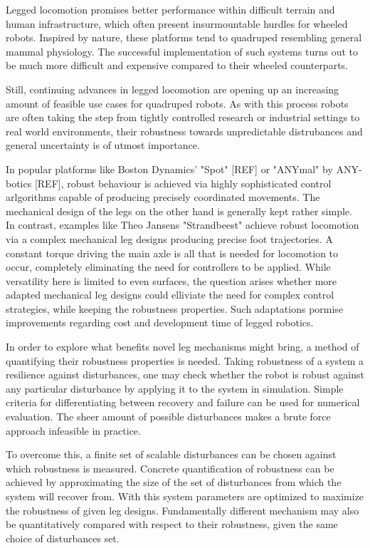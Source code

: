 Legged locomotion promises better performance within difficult terrain and human infrastructure, which often present insurmountable hurdles for wheeled robots. Inspired by nature, these platforms tend to quadruped resembling general mammal physiology. The successful implementation of such systems turns out to be much more difficult and expensive compared to their wheeled counterparts. 

Still, continuing advances in legged locomotion are opening up an increasing amount of feasible use cases for quadruped robots. As with this process robots are often taking the step from tightly controlled research or industrial settings to real world environments, their robustness towards unpredictable distrubances and general uncertainty is of utmost importance. 

In popular platforms like Boston Dynamics' "Spot" [REF] or "ANYmal" by ANY-botics [REF], robust behaviour is achieved via highly sophisticated control arlgorithms capable of producing precisely coordinated movements. The mechanical design of the legs on the other hand is generally kept rather simple. In contrast, examples like Theo Jansens "Strandbeest" \cite{jansen} achieve robust locomotion via a complex mechanical leg designs producing precise foot trajectories. A constant torque driving the main axle is all that is needed for locomotion to occur, completely eliminating the need for controllers to be applied.   
While versatility here is limited to even surfaces, the question arises whether more adapted mechanical leg designs could elliviate the need for complex control strategies, while keeping the robustness properties. Such adaptations pormise improvements regarding cost and development time of legged robotics.

In order to explore what benefits novel leg mechanisms might bring, a method of quantifying their robustness properties is needed. Taking robustness of a system a resilience against disturbances, one may check whether the robot is robust against any particular disturbance by applying it to the system in simulation. Simple criteria for differentiating between recovery and failure can be used for numerical evaluation. The sheer amount of possible disturbances makes a brute force approach infeasible in practice. 

To overcome this, a finite set of scalable disturbances can be chosen against which robustness is measured. Concrete quantification of robustness can be achieved by approximating the size of the set of disturbances from which the system will recover from. 
With this system parameters are optimized to maximize the robustness of given leg designs. Fundamentally different mechanism may also be quantitatively compared with respect to their robustness, given the same choice of disturbances set.

